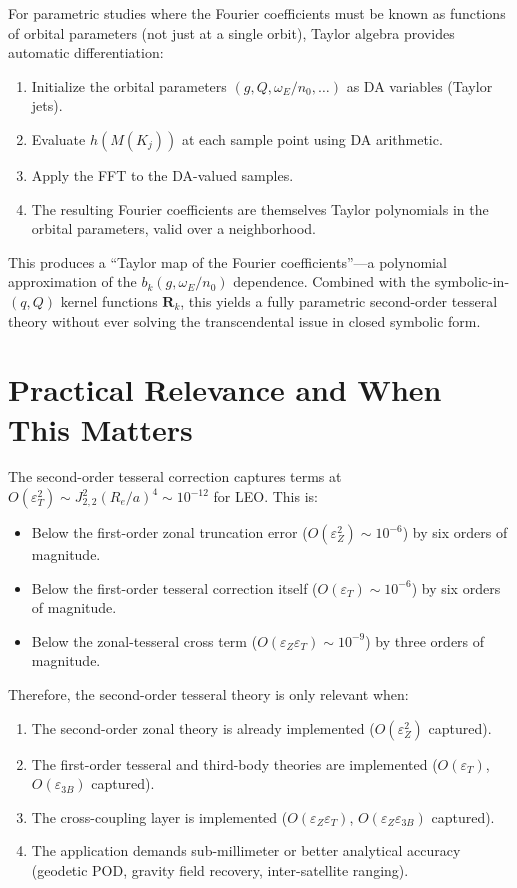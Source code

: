\documentclass[11pt]{article}
\newcommand{\eps}{\varepsilon}
\begin{document}
For parametric studies where the Fourier coefficients must be known as
functions of orbital parameters (not just at a single orbit), Taylor
algebra provides automatic differentiation:
\begin{enumerate}
\item Initialize the orbital parameters $(g, Q, \omega_E/n_0, \ldots)$
as DA variables (Taylor jets).
\item Evaluate $h(M(K_j))$ at each sample point using DA arithmetic.
\item Apply the FFT to the DA-valued samples.
\item The resulting Fourier coefficients are themselves Taylor polynomials
in the orbital parameters, valid over a neighborhood.
\end{enumerate}

This produces a ``Taylor map of the Fourier coefficients''---a polynomial
approximation of the $b_k(g, \omega_E/n_0)$ dependence. Combined with
the symbolic-in-$(q, Q)$ kernel functions $\bm R_k$, this yields a
fully parametric second-order tesseral theory without ever solving the
transcendental issue in closed symbolic form.


\section{Practical Relevance and When This Matters}
\label{sec:relevance}

The second-order tesseral correction captures terms at
$O(\eps_T^2) \sim J_{2,2}^2 (R_e/a)^4 \sim 10^{-12}$ for LEO. This is:
\begin{itemize}
\item Below the first-order zonal truncation error
($O(\eps_Z^2) \sim 10^{-6}$) by six orders of magnitude.
\item Below the first-order tesseral correction itself
($O(\eps_T) \sim 10^{-6}$) by six orders of magnitude.
\item Below the zonal-tesseral cross term
($O(\eps_Z \eps_T) \sim 10^{-9}$) by three orders of magnitude.
\end{itemize}

Therefore, the second-order tesseral theory is only relevant when:
\begin{enumerate}
\item The second-order zonal theory is already implemented
($O(\eps_Z^2)$ captured).
\item The first-order tesseral and third-body theories are implemented
($O(\eps_T)$, $O(\eps_{3B})$ captured).
\item The cross-coupling layer is implemented
($O(\eps_Z \eps_T)$, $O(\eps_Z \eps_{3B})$ captured).
\item The application demands sub-millimeter or better analytical
accuracy (geodetic POD, gravity field recovery, inter-satellite ranging).
\end{enumerate}
\end{document}
